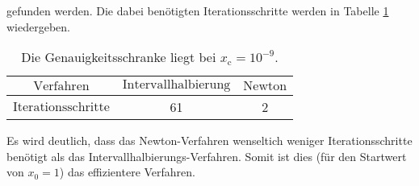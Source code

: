 \noindent
gefunden werden. Die dabei benötigten Iterationsschritte werden in Tabelle
\ref{tab:A2} wiedergeben.

\begin{table}
\centering
\begin{tabular}{c c c}
  \toprule
  $\text{Verfahren}$          & $\text{Intervallhalbierung}$ & $\text{Newton}$  \\
  \midrule
  $\text{Iterationsschritte}$ & 61                           & 2                \\
  \bottomrule
\end{tabular}
\caption{Die Genauigkeitsschranke liegt bei $x_{\text{c}} = 10^{-9}$.}
\label{tab:A2}
\end{table}

\noindent
Es wird deutlich, dass das Newton-Verfahren wenseltich weniger Iterationsschritte
benötigt als das Intervallhalbierungs-Verfahren. Somit ist dies (für den Startwert von
$x_0 = 1$) das effizientere Verfahren.



